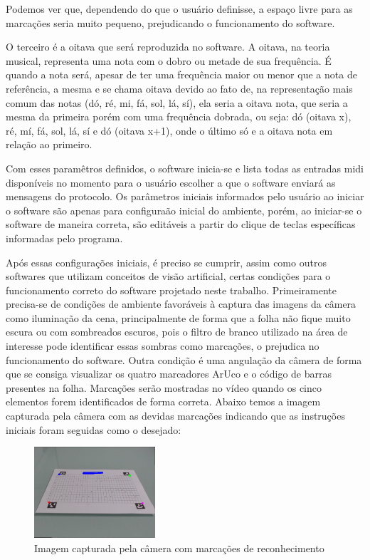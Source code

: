 \documentclass[12pt]{report}
\begin{document}
{Podemos ver que, dependendo do que o usuário definisse, a espaço livre para as marcações seria muito pequeno, prejudicando o funcionamento do software.

O terceiro é a oitava que será reproduzida no software. A oitava, na teoria musical, representa uma nota com o dobro ou metade de sua frequência. É quando a nota será, apesar de ter uma frequência maior ou menor que a nota de referência, a mesma e se chama oitava devido ao fato de, na representação mais comum das notas (dó, ré, mi, fá, sol, lá, sí), ela seria a oitava nota, que seria a mesma da primeira porém com uma frequência dobrada, ou seja: dó (oitava x), ré, mí, fá, sol, lá, sí e dó (oitava x+1), onde o último só e a oitava nota em relação ao primeiro.

Com esses paramêtros definidos, o software inicia-se e lista todas as entradas midi disponíveis no momento para o usuário escolher a que o software enviará as mensagens do protocolo. Os parâmetros iniciais informados pelo usuário ao iniciar o software são apenas para configuraão inicial do ambiente, porém, ao iniciar-se o software de maneira correta, são editáveis a partir do clique de teclas específicas informadas pelo programa.

Após essas configurações iniciais, é preciso se cumprir, assim como outros softwares que utilizam conceitos de visão artificial, certas condições para o funcionamento correto do software projetado neste trabalho.
Primeiramente precisa-se de condições de ambiente favoráveis à captura das imagens da câmera como iluminação da cena, principalmente de forma que a folha não fique muito escura ou com sombreados escuros, pois o filtro de branco utilizado na área de interesse pode identificar essas sombras como marcações, o prejudica no funcionamento do software. Outra condição é uma angulação da câmera de forma que se consiga visualizar os quatro marcadores ArUco e o código de barras presentes na folha. Marcações serão mostradas no vídeo quando os cinco elementos forem identificados de forma correta. Abaixo temos a imagem capturada pela câmera com as devidas marcações indicando que as instruções iniciais foram seguidas como o desejado:

\begin{figure}[H]
  \centering
    \includegraphics[width=0.4\textwidth]{imagens/video_com_marcacoes.png}
    \caption{Imagem capturada pela câmera com marcações de reconhecimento}
    \label{fig:tudo_ok}
\end{figure}

}
\end{document}
